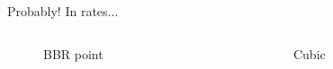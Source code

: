 \documentclass[aspectratio=169,xcolor={dvipsnames}
,notes
,handout
]{beamer}
\begin{document}
\begin{frame}{Probably! In rates...}
	\begin{columns}
		\begin{column}{0.5\linewidth}
			\begin{figure}
				\caption{BBR point}
			\end{figure}
		\end{column}
		\begin{column}{0.5\linewidth}
			\begin{figure}
				\caption{Cubic}
			\end{figure}
		\end{column}
	\end{columns}
\end{frame}
\end{document}
